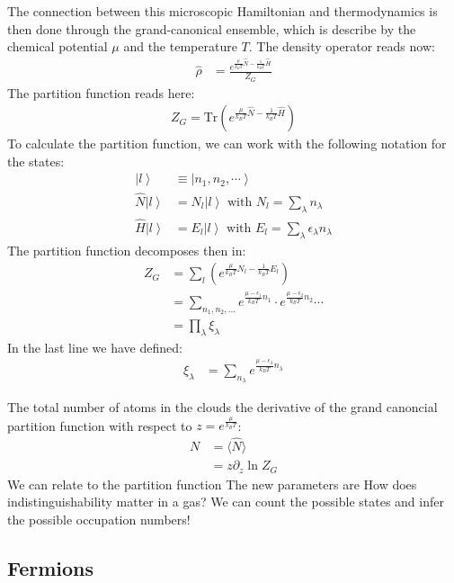 \documentclass[10pt]{article}
\newcommand{\ket}[1]{\ensuremath{\left|#1\right\rangle}}
\begin{document}
The connection between this microscopic Hamiltonian and thermodynamics is then done through the grand-canonical ensemble, which is describe by the chemical potential $\mu$ and the temperature $T$. The density operator reads now:
\begin{align}
\hat{\rho} &= \frac{e^{\frac{\mu}{k_BT} \hat{N}-\frac{1}{k_BT}\hat{H}}}{Z_G}
\end{align}
The partition function reads here:
\begin{align}
Z_G = \mathrm{Tr}\left(e^{\frac{\mu}{k_BT} \hat{N}-\frac{1}{k_BT}\hat{H}}\right)
\end{align}
To calculate the partition function, we can work with the following notation for the states:
\begin{align}
\ket{l}&\equiv\ket{n_1, n_2,\cdots}\\
\hat{N}\ket{l} &= N_l\ket{l}\text{ with }N_l=\sum_\lambda n_\lambda\\
\hat{H}\ket{l} &= E_l\ket{l}\text{ with }E_l=\sum_\lambda \epsilon_\lambda n_\lambda
\end{align}
The partition function decomposes then in:
\begin{align}
Z_G &= \sum_l\left(e^{\frac{\mu}{k_BT} N_l-\frac{1}{k_BT}E_l}\right)\\
&= \sum_{n_1, n_2, ...} e^{\frac{\mu-\epsilon_1}{k_BT} n_1}\cdot e^{\frac{\mu-\epsilon_2}{k_BT} n_2}\cdots\\
&=\prod_\lambda \xi_\lambda
\end{align}
In the last line we have defined:
\begin{align}\label{Eq:XiGeneral}
\xi_\lambda &= \sum_{n_\lambda} e^{\frac{\mu-\epsilon_\lambda}{k_BT} n_\lambda}
\end{align}


The total number of atoms in the clouds the derivative of the grand canoncial partition function with respect to $z = e^{\frac{\mu}{k_B T}}$:
\begin{align}
N &= \langle \hat{N}\rangle\\
&= z\partial_z \ln Z_G
\end{align}
We can relate to the partition function 
The new parameters are
How does indistinguishability matter in a gas? We can count the possible states and infer the possible occupation numbers!





\subsection{Fermions}
\end{document}
